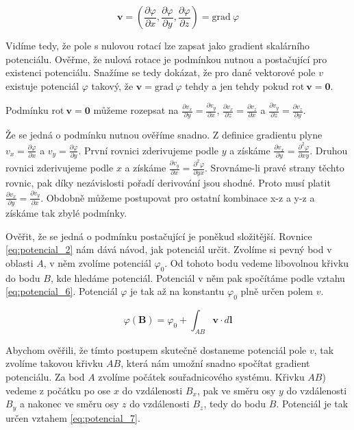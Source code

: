 \documentclass{book}
\newcommand{\vect}[1]{\boldsymbol{#1}}
\newcommand{\grad}{\mathrm{grad}}
\newcommand{\rot}{\mathrm{rot}}
\begin{document}
\begin{equation}
\label{eq:potencial_5}
\vect{v} = \left(\frac{\partial \varphi}{\partial x}, \frac{\partial \varphi}{\partial y}, \frac{\partial \varphi}{\partial z}\right) = \grad \ \varphi
\end{equation}

Vidíme tedy, že pole s nulovou rotací lze zapsat jako gradient skalárního potenciálu. Ověřme, že nulová rotace je podmínkou nutnou a postačující pro existenci
potenciálu. Snažíme se tedy dokázat, že pro dané vektorové pole \(v\) existuje potenciál \(\varphi\) takový, že \(\vect{v} = \grad \ \varphi\) tehdy a jen tehdy
pokud \(\rot \ \vect{v} = \vect{0}\).

Podmínku \(\rot \ \vect{v} = \vect{0}\) můžeme rozepsat na \(\frac{\partial v_x}{\partial y} = \frac{\partial v_y}{\partial x}\), \(\frac{\partial v_x}{\partial z} = \frac{\partial v_z}{\partial x}\) a \(\frac{\partial v_y}{\partial z} = \frac{\partial v_z}{\partial y}\).

Že se jedná o podmínku nutnou ověříme snadno. Z definice gradientu plyne \(v_x = \frac{\partial \varphi}{\partial x}\) a \(v_y = \frac{\partial \varphi}{\partial y}\). První rovnici zderivujeme podle \(y\) a získáme \(\frac{\partial v_x}{\partial y} = \frac{\partial^2 \varphi}{\partial x y}\). Druhou rovnici
zderivujeme podle \(x\) a získáme \(\frac{\partial v_y}{\partial x} = \frac{\partial^2 \varphi}{\partial y x}\). Srovnáme-li pravé strany těchto rovnic, pak
díky nezávislosti pořadí derivování jsou shodné. Proto musí platit \(\frac{\partial v_x}{\partial y} = \frac{\partial v_y}{\partial x}\). Obdobně můžeme
postupovat pro ostatní kombinace x-z a y-z a získáme tak zbylé podmínky.

Ověřit, že se jedná o podmínku postačující je poněkud složitější. Rovnice \eqref{eq:potencial_2} nám dává návod, jak potenciál určit. Zvolíme si pevný bod
v oblasti \(A\), v něm zvolíme potenciál \(\varphi_0\). Od tohoto bodu vedeme libovolnou křivku do bodu \(B\), kde hledáme potenciál. Potenciál v něm
pak spočítáme podle vztahu \eqref{eq:potencial_6}. Potenciál \(\varphi\) je tak až na konstantu \(\varphi_0\) plně určen polem \(v\).

\begin{equation}
\label{eq:potencial_6}
\varphi(\vect{B}) = \varphi_0 + \int_{AB} \vect{v} \cdot d\vect{l}
\end{equation}

Abychom ověřili, že tímto postupem skutečně dostaneme potenciál pole \(v\), tak zvolíme takovou křivku \(AB\), která nám umožní snadno spočítat gradient
potenciálu. Za bod \(A\) zvolíme počátek souřadnicového systému. Křivku \(AB\)) vedeme z počátku po ose \(x\) do vzdálenosti \(B_x\), pak ve směru osy
\(y\) do vzdálenosti \(B_y\) a nakonec ve směru osy \(z\) do vzdálenosti \(B_z\), tedy do bodu \(B\). Potenciál je tak určen vztahem \eqref{eq:potencial_7}.
\end{document}
